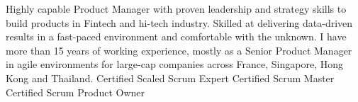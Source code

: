 

\begin{cvparagraph}


Highly capable Product Manager with proven leadership and strategy skills to build products in Fintech and hi-tech industry. Skilled at delivering data-driven results in a fast-paced environment and comfortable with the unknown. I have more than 15 years of working experience, mostly as a Senior Product Manager in agile environments for large-cap companies across France, Singapore, Hong Kong and Thailand.
\newline
\newline
Certified Scaled Scrum Expert
\newline
Certified Scrum Master
\newline
Certified Scrum Product Owner

\end{cvparagraph}
